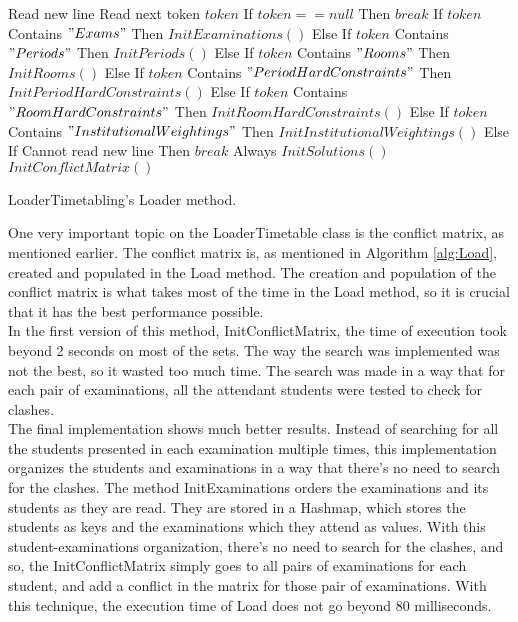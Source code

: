 \begin{algorithm}
\begin{algorithmic}[1]
\State Read new line
\Repeat
	\State Read next token $token$
	\State If $token == null$ Then $break$ 
	\State If $token$ Contains $"Exams"$ Then $InitExaminations()$
	\State Else If $token$ Contains $"Periods"$ Then $InitPeriods()$
	\State Else If $token$ Contains $"Rooms"$ Then $InitRooms()$
	\State Else If $token$ Contains $"PeriodHardConstraints"$ Then $InitPeriodHardConstraints()$
	\State Else If $token$ Contains $"RoomHardConstraints"$ Then $InitRoomHardConstraints()$
	\State Else If $token$ Contains $"InstitutionalWeightings"$ Then $InitInstitutionalWeightings()$
	\State Else If Cannot read new line Then $break$ 
\Until Always
\State $InitSolutions()$
\State $InitConflictMatrix()$
\end{algorithmic}
\caption{LoaderTimetabling's Loader method.}
\label{alg:Load}
\end{algorithm}

One very important topic on the LoaderTimetable class is the conflict matrix, as mentioned earlier. The conflict matrix is, as mentioned in Algorithm \ref{alg:Load}, created and populated in the Load method. The creation and population of the conflict matrix is what takes most of the time in the Load method, so it is crucial that it has the best performance possible.\\

In the first version of this method, InitConflictMatrix, the time of execution took beyond 2 seconds on most of the sets. The way the search was implemented was not the best, so it wasted too much time. The search was made in a way that for each pair of examinations, all the attendant students were tested to check for clashes.\\

The final implementation shows much better results. Instead of searching for all the students presented in each examination multiple times, this implementation organizes the students and examinations in a way that there's no need to search for the clashes. The method InitExaminations orders the examinations and its students as they are read. They are stored in a Hashmap, which stores the students as keys and the examinations which they attend as values. With this student-examinations organization, there's no need to search for the clashes, and so, the InitConflictMatrix simply goes to all pairs of examinations for each student, and add a conflict in the matrix for those pair of examinations. With this technique, the execution time of Load does not go beyond 80 milliseconds.

